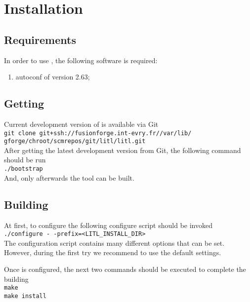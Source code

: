 \chapter{Installation}
\section{Requirements}
In order to use \litl{}, the following software is required:
\begin{enumerate}
 \item autoconf of version 2.63;
 
\end{enumerate}

\section{Getting \litl}
Current development version of \litl{} is available via Git\\
    \hspace*{0.9cm}\texttt{git clone git+ssh://fusionforge.int-evry.fr//var/lib/}\\
    \hspace*{0.9cm}\texttt{gforge/chroot/scmrepos/git/litl/litl.git}\\
After getting the latest development version from Git, the following command 
should be run\\
\hspace*{0.9cm}\texttt{./bootstrap}\\ 
And, only afterwards the tool can be built.

\section{Building \eztrace{}}
At first, to configure \litl{} the following configure script should be 
invoked\\
    \hspace*{0.9cm}\texttt{./configure -\,-prefix=<LITL\_INSTALL\_DIR>}\\
The configuration script contains many different options that can be set. 
However, during the first try we recommend to use the default settings.

Once \litl{} is configured, the next two commands should be executed to complete  
the building\\
    \hspace*{0.9cm}\texttt{make}\\
    \hspace*{0.9cm}\texttt{make install}


